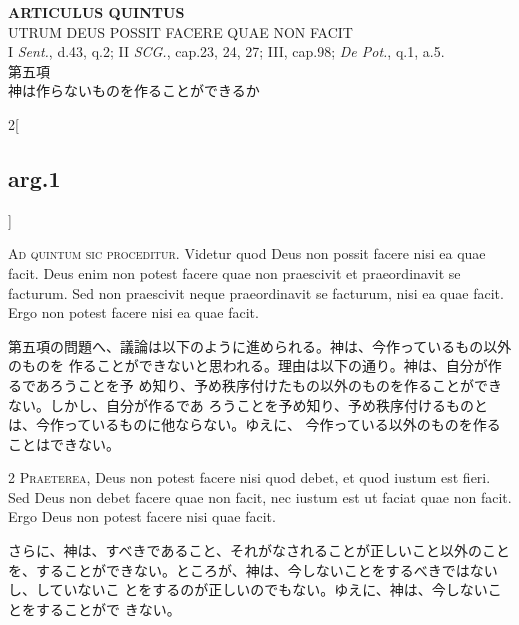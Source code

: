 \documentclass[paper=a4paper,fontsize=10pt,jafontsize=9pt,titlepage]{jlreq}
\begin{document}
\begin{center}
 {\Large {\bfseries ARTICULUS QUINTUS}}\\
 {\large UTRUM DEUS POSSIT FACERE QUAE NON FACIT}\\
 {\footnotesize I {\itshape Sent.}, d.43, q.2; II {\itshape SCG.},
 cap.23, 24, 27; III, cap.98; {\itshape De Pot.}, q.1, a.5.}\\
 {\Large 第五項\\神は作らないものを作ることができるか}
\end{center}

\begin{paracol}{2}[\subsection{arg.1}]

{\Huge A}{\scshape d quintum sic proceditur}. Videtur quod
Deus non possit facere nisi ea quae facit. Deus enim non potest facere
quae non praescivit et praeordinavit se facturum. Sed non praescivit
neque praeordinavit se facturum, nisi ea quae facit. Ergo non potest
facere nisi ea quae facit.

\switchcolumn

第五項の問題へ、議論は以下のように進められる。神は、今作っているもの以外のものを
作ることができないと思われる。理由は以下の通り。神は、自分が作るであろうことを予
め知り、予め秩序付けたもの以外のものを作ることができない。しかし、自分が作るであ
ろうことを予め知り、予め秩序付けるものとは、今作っているものに他ならない。ゆえに、
今作っている以外のものを作ることはできない。


{\scshape 2 Praeterea}, Deus non potest facere nisi quod
debet, et quod iustum est fieri. Sed Deus non debet facere quae non
facit, nec iustum est ut faciat quae non facit. Ergo Deus non potest
facere nisi quae facit.

\switchcolumn

さらに、神は、すべきであること、それがなされることが正しいこと以外のこと
 を、することができない。ところが、神は、今しないことをするべきではないし、していないこ
とをするのが正しいのでもない。ゆえに、神は、今しないことをすることがで
きない。



\end{paracol}
\end{document}
